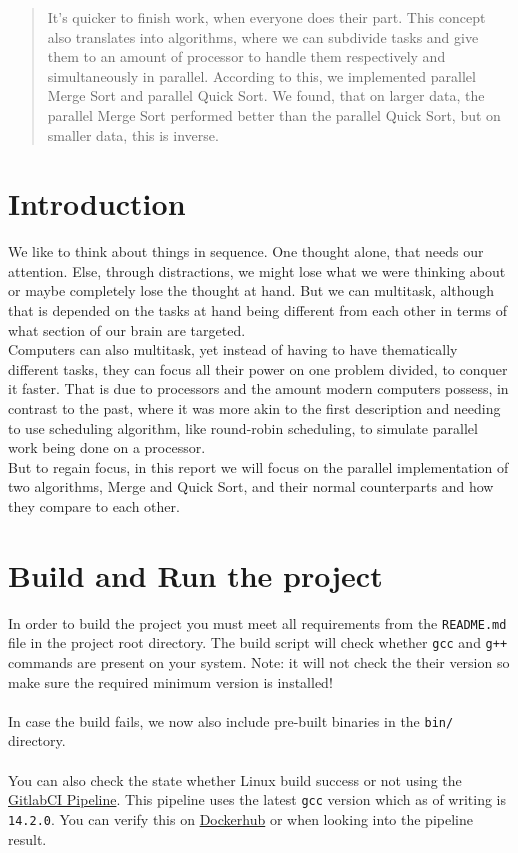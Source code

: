 \documentclass[twocolumn]{article}
\begin{document}


\begin{abstract}
    It's quicker to finish work, when everyone does their part. This concept also translates into algorithms, where we can subdivide tasks and give them to an amount of processor to handle them respectively and simultaneously in parallel. According to this, we implemented parallel Merge Sort and parallel Quick Sort. We found, that on larger data, the parallel Merge Sort performed better than the parallel Quick Sort, but on smaller data, this is inverse.
\end{abstract}


\section{Introduction}
We like to think about things in sequence. One thought alone, that needs our attention. Else, through distractions, we might lose what we were thinking about or maybe completely lose the thought at hand. But we can multitask, although that is depended on the tasks at hand being different from each other in terms of what section of our brain are targeted.\\
Computers can also multitask, yet instead of having to have thematically different tasks, they can focus all their power on one problem divided, to conquer it faster. That is due to processors and the amount modern computers possess, in contrast to the past, where it was more akin to the first description and needing to use scheduling algorithm, like round-robin scheduling, to simulate parallel work being done on a processor.\\
But to regain focus, in this report we will focus on the parallel implementation of two algorithms, Merge and Quick Sort, and their normal counterparts and how they compare to each other.


\section{Build and Run the project}
In order to build the project you must meet all requirements from the \texttt{README.md} file in the project root directory.
The build script will check whether \texttt{gcc} and \texttt{g++} commands are present on your system. 
Note: it will not check the their version so make sure the required minimum version is installed!\\
\\
In case the build fails, we now also include pre-built binaries in the \texttt{bin/} directory.\\
\\
You can also check the state whether Linux build success or not using the \href{https://gitlab.inf.uni-konstanz.de/ag-storandt/ae-24/koston.schwitz/-/pipelines}{GitlabCI Pipeline}. 
This pipeline uses the latest \texttt{gcc} version which as of writing is \texttt{14.2.0}. 
You can verify this on \href{https://hub.docker.com/_/gcc}{Dockerhub} or when looking into the pipeline result.
\end{document}
